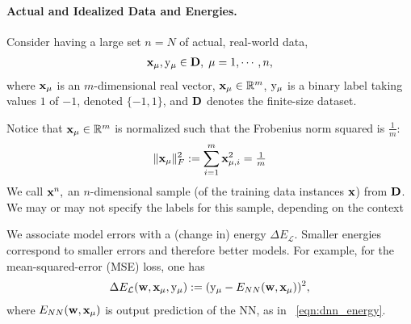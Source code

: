 \paragraph{Actual and Idealized Data and Energies.}

Consider having a large set $n=N$ of actual, real-world data, 
\begin{align}
  \label{eqn:x}
  {\mathbf{x}}_{\mu}, \mathrm{y}_{\mu} \in\mathbf{D},\;\mu=1, \cdots, n,
\end{align}
where 
${\mathbf{x}}_{\mu}$ is an $m$-dimensional real vector, 
${\mathbf{x}}_{\mu}\in\mathbb{R}^{m}$,
$\mathrm{y}_{\mu}$ is a binary label taking values $1$ of $-1$, denoted $\{-1,1\}$, and 
$\mathbf{D}$ denotes the finite-size dataset.

Notice that ${\mathbf{x}}_{\mu}\in\mathbb{R}^{m}$ is normalized such that the Frobenius norm squared is $\tfrac{1}{m}$:
  \begin{equation}
    \label{eqn:XVEC_norm}
   \Vert{\mathbf{x}}_{\mu}\Vert^{2}_{F} := \sum_{i=1}^{m} {\mathbf{x}}_{\mu,i}^{2}=\tfrac{1}{m}
  \end{equation}
We call ${\mathbf{x}}^{n},$ an $n$-dimensional sample (of the training data instances ${\mathbf{x}}$) from $\mathbf{D}$.  We may or may not specify the labels for this sample, depending on the context

We associate model errors
with a (change in) energy $\Delta E_{\mathcal{L}}$. Smaller energies correspond to smaller errors and therefore better models.
For example, for the mean-squared-error (MSE) loss, one has
\begin{align}
  \label{eqn:DEy}
  \Delta E_{\mathcal{L}}({\mathbf{w}},{\mathbf{x}}_{\mu},\mathrm{y}_{\mu}):= (\mathrm{y}_{\mu}-E_{NN}({\mathbf{w}},{\mathbf{x}}_{\mu}))^{2}  ,
\end{align}
where 
$E_{NN}({\mathbf{w}},{\mathbf{x}}_{\mu})$ is output prediction of the NN, as in \EQN~\ref{eqn:dnn_energy}.



